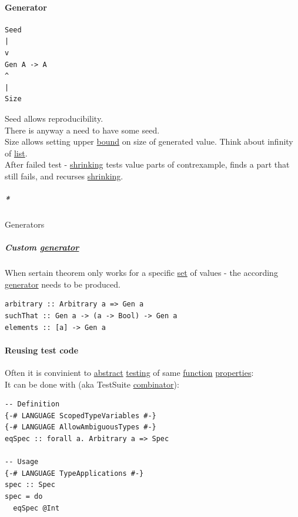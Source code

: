 \documentclass[11pt]{article}
\begin{document}
\paragraph{\label{org7808460}Generator}
\label{sec:orgc861eda}
\begin{verbatim}
Seed
|
v
Gen A -> A
^
|
Size
\end{verbatim}

Seed allows reproducibility.\\
There is anyway a need to have some seed.\\
Size allows setting upper \hyperref[org7d65bda]{bound} on size of generated value. Think about infinity of \hyperref[org8ae0f28]{list}.\\

After failed test - \hyperref[org6a14777]{shrinking} tests value parts of contrexample, finds a part that still fails, and recurses \hyperref[org6a14777]{shrinking}.\\

\subparagraph{\emph{*}}
\label{sec:org9418994}

\label{org86017a3}Generators\\

\subparagraph{Custom \hyperref[org7808460]{generator}}
\label{sec:orga399496}
When sertain theorem only works for a specific \hyperref[orgbed80ba]{set} of values - the according \hyperref[org7808460]{generator} needs to be produced.\\

\begin{verbatim}
arbitrary :: Arbitrary a => Gen a
suchThat :: Gen a -> (a -> Bool) -> Gen a
elements :: [a] -> Gen a
\end{verbatim}

\paragraph{\label{org4a0e7fd}Reusing test code}
\label{sec:org65f6ad9}
Often it is convinient to \hyperref[org606d002]{abstract} \hyperref[orgba42eb2]{testing} of same \hyperref[orgeb5cddb]{function} \hyperref[org763ad6b]{properties}:\\

It can be done with (aka TestSuite \hyperref[org4025da2]{combinator}):\\
\begin{verbatim}
-- Definition
{-# LANGUAGE ScopedTypeVariables #-}
{-# LANGUAGE AllowAmbiguousTypes #-}
eqSpec :: forall a. Arbitrary a => Spec

-- Usage
{-# LANGUAGE TypeApplications #-}
spec :: Spec
spec = do
  eqSpec @Int
\end{verbatim}
\end{document}
